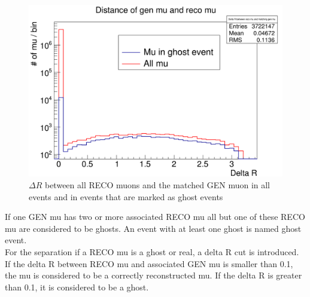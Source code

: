 \begin{figure}[b]
\centering
\begin{minipage}[t]{0.95\textwidth}
\includegraphics[width=\textwidth]{Figures/scheuch/Trennung.png}
\caption{$\Delta R$ between all RECO muons and the matched GEN muon in all events and in events that are marked as ghost events}
\label{DeltaRDistribution}
\end{minipage}
\end{figure}
If one GEN mu has two or more associated RECO mu all but one of these RECO mu are considered to be ghosts. An event with at least one ghost is named ghost event.\\
For the separation if a RECO mu is a ghost or real, a delta R cut is introduced. If the delta R between RECO mu and associated GEN mu is smaller than 0.1, the mu is considered to be a correctly reconstructed mu. If the delta R is greater than 0.1, it is considered to be a ghost.

